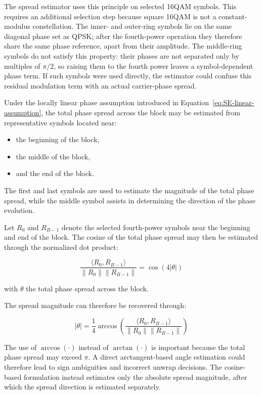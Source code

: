 The spread estimator uses this principle on selected \ac{16QAM} symbols. This requires an additional selection step because square 16QAM is not a constant-modulus constellation. The inner- and outer-ring symbols lie on the same diagonal phase set as \ac{QPSK}; after the fourth-power operation they therefore share the same phase reference, apart from their amplitude. The middle-ring symbols do not satisfy this property: their phases are not separated only by multiples of \(\pi/2\), so raising them to the fourth power leaves a symbol-dependent phase term. If such symbols were used directly, the estimator could confuse this residual modulation term with an actual carrier-phase spread.

Under the locally linear phase assumption introduced in Equation~\ref{eq:SE-linear-assumption}, the total phase spread across the block may be estimated from representative symbols located near:
\begin{itemize}
    \item the beginning of the block,
    \item the middle of the block,
    \item and the end of the block.
\end{itemize}

The first and last symbols are used to estimate the magnitude of the total phase spread, while the middle symbol assists in determining the direction of the phase evolution.

Let $R_0$ and $R_{B-1}$ denote the selected fourth-power symbols near the beginning and end of the block. The cosine of the total phase spread may then be estimated through the normalized dot product:

\begin{equation}
\frac{\langle R_0,R_{B-1}\rangle}
{\|R_0\|\|R_{B-1}\|}
=
\cos(4|\theta|)
\label{eq:spread-cos}
\end{equation}

with $\theta$ the total phase spread across the block.

The spread magnitude can therefore be recovered through:

\begin{equation}
|\theta| =
\frac{1}{4}
\arccos
\left(
\frac{\langle R_0,R_{B-1}\rangle}
{\|R_0\|\|R_{B-1}\|}
\right)
\label{eq:spread-mag}
\end{equation}

The use of $\arccos(\cdot)$ instead of $\arctan(\cdot)$ is important because the total phase spread may exceed $\pi$. A direct arctangent-based angle estimation could therefore lead to sign ambiguities and incorrect unwrap decisions. The cosine-based formulation instead estimates only the absolute spread magnitude, after which the spread direction is estimated separately.

